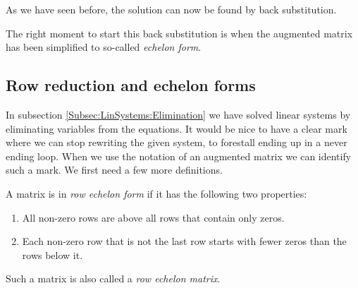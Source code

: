 As we have seen before, the solution can now be found by back substitution.

The right moment to start this back substitution is when the augmented matrix has been simplified to so-called \emph{echelon form}.\\


\subsection{Row reduction and echelon forms}
\label{Subsec:LinSystems:RowReduction}


In subsection \ref{Subsec:LinSystems:Elimination}  we have solved linear systems by eliminating variables from the equations. It would be nice to have a clear mark where we can stop rewriting the given system, to forestall ending up in a never ending loop.  When we use the notation of an augmented matrix we can identify such a mark.
We first need a few more definitions.





\begin{dfn}
\label{Dfn:LinSystems:EchelonForm}
A matrix is  in \emph{row echelon form}  if it has the following two properties:

\begin{enumerate}[label=(\roman*)]
\item All non-zero rows are above all rows that contain only zeros.
\item Each non-zero row that is not the last row starts with fewer zeros than the rows below it.
\end{enumerate}

Such a matrix is also called a  \emph{row echelon matrix}.
\end{dfn}

